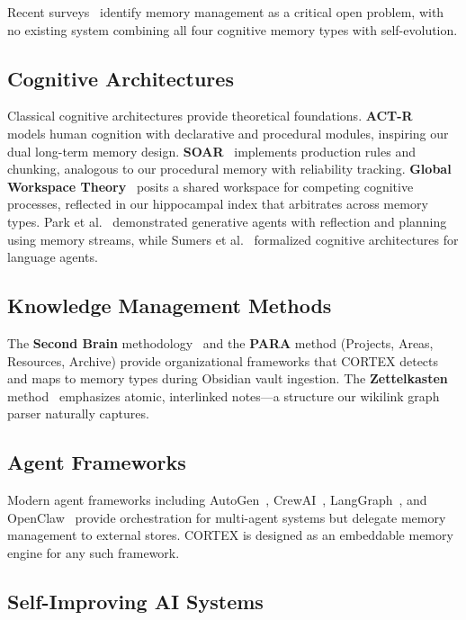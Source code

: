 \documentclass[runningheads]{llncs}
\begin{document}
Recent surveys~\cite{zhang2024survey,hatalis2023memory} identify memory management as a critical open problem, with no existing system combining all four cognitive memory types with self-evolution.

\subsection{Cognitive Architectures}

Classical cognitive architectures provide theoretical foundations. \textbf{ACT-R}~\cite{anderson2004act} models human cognition with declarative and procedural modules, inspiring our dual long-term memory design. \textbf{SOAR}~\cite{laird2012soar} implements production rules and chunking, analogous to our procedural memory with reliability tracking. \textbf{Global Workspace Theory}~\cite{baars2005gwt} posits a shared workspace for competing cognitive processes, reflected in our hippocampal index that arbitrates across memory types. Park et al.~\cite{park2023generative} demonstrated generative agents with reflection and planning using memory streams, while Sumers et al.~\cite{sumers2023cognitive} formalized cognitive architectures for language agents.

\subsection{Knowledge Management Methods}

The \textbf{Second Brain} methodology~\cite{forte2022second} and the \textbf{PARA} method (Projects, Areas, Resources, Archive) provide organizational frameworks that CORTEX detects and maps to memory types during Obsidian vault ingestion. The \textbf{Zettelkasten} method~\cite{ahrens2017zettelkasten} emphasizes atomic, interlinked notes---a structure our wikilink graph parser naturally captures.

\subsection{Agent Frameworks}

Modern agent frameworks including AutoGen~\cite{wu2023autogen}, CrewAI~\cite{crewai2024}, LangGraph~\cite{langgraph2024}, and OpenClaw~\cite{openclaw2025} provide orchestration for multi-agent systems but delegate memory management to external stores. CORTEX is designed as an embeddable memory engine for any such framework.

\subsection{Self-Improving AI Systems}
\end{document}
